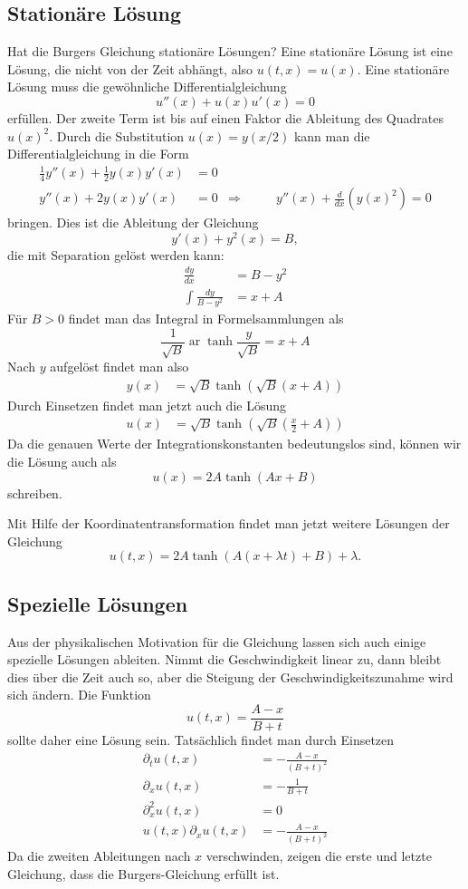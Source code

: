 \subsection{Stationäre Lösung}
Hat die Burgers Gleichung stationäre Lösungen? Eine stationäre Lösung ist
eine Lösung, die nicht von der Zeit abhängt, also
$u(t,x)=u(x)$.
Eine stationäre Lösung muss die gewöhnliche
Differentialgleichung
\[
u''(x)+u(x)u'(x)=0
\]
erfüllen. Der zweite Term ist bis auf einen Faktor die Ableitung
des Quadrates $u(x)^2$. Durch die Substitution $u(x)=y(x/2)$ kann man
die Differentialgleichung in die Form
\begin{align*}
\frac14y''(x)+\frac12y(x)y'(x)&=0
\\
y''(x)+2y(x)y'(x)&=0&\Rightarrow&\qquad y''(x)+\frac{d}{dx}(y(x)^2)=0
\end{align*}
bringen.
Dies ist die Ableitung der Gleichung
\[
y'(x)+y^2(x)=B,
\]
die mit Separation gelöst werden kann:
\begin{align*}
\frac{dy}{dx}&=B-y^2\\
\int\frac{dy}{B-y^2}&=x+A
\end{align*}
Für $B>0$  findet man das Integral in Formelsammlungen als
\[
\frac1{\sqrt{B}}\operatorname{ar}\tanh \frac{y}{\sqrt{B}}=x+A
\]
Nach $y$ aufgelöst findet man also
\begin{align*}
y(x)&=\sqrt{B}\tanh(\sqrt{B}(x+A))
\end{align*}
Durch Einsetzen findet man jetzt auch die Lösung
\begin{align*}
u(x)&=
\sqrt{B}\tanh\left(\sqrt{B}\left(\frac{x}2+A\right)\right)
\end{align*}
Da die genauen Werte der Integrationskonstanten bedeutungslos sind, können
wir die Lösung auch als
\[
u(x)= 2A \tanh (Ax+B) 
\]
schreiben.

Mit Hilfe der Koordinatentransformation findet man jetzt weitere Lösungen
der Gleichung
\[
u(t,x)=
2A \tanh (A(x+\lambda t)+B) +\lambda.
\]

\subsection{Spezielle Lösungen}
Aus der physikalischen Motivation für die Gleichung lassen sich auch
einige spezielle Lösungen ableiten.
Nimmt die Geschwindigkeit linear zu, dann bleibt dies über die Zeit auch
so, aber die Steigung der Geschwindigkeitszunahme wird sich ändern.
Die Funktion
\[
u(t,x)=\frac{A-x}{B+t}
\]
sollte daher
eine Lösung sein. Tatsächlich findet man durch Einsetzen
\begin{align*}
\partial_t u(t,x)&=-\frac{A-x}{(B+t)^2}
\\
\partial_x u(t,x)&=-\frac{1}{B+t}
\\
\partial_x^2 u(t,x)&=0
\\
u(t,x)
\partial_xu(t,x)&=-\frac{A-x}{(B+t)^2}
\end{align*}
Da die zweiten Ableitungen nach $x$ verschwinden,
zeigen die erste und letzte Gleichung, dass die Burgers-Gleichung
erfüllt ist.

